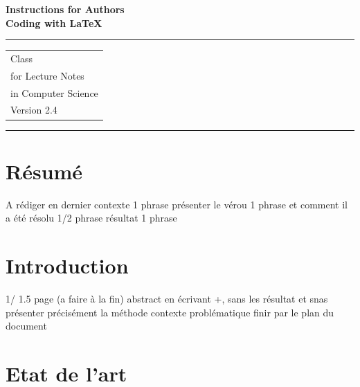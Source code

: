 \documentclass{llncs}
\begin{document}
\thispagestyle{empty}
\begin{flushleft}
\LARGE\bfseries Instructions for Authors\\
Coding with \LaTeX\\[2cm]
\end{flushleft}
\rule{\textwidth}{1pt}
\vspace{2pt}
\begin{flushright}
\Huge
\begin{tabular}{@{}l}
\LaTeXe{} Class\\
for Lecture Notes\\
in Computer Science\\[6pt]
{\Large Version 2.4}
\end{tabular}
\end{flushright}
\rule{\textwidth}{1pt}
\vfill
%
\newpage
\tableofcontents
\newpage
%
\section{Résumé}
%
 A rédiger en dernier
contexte 1 phrase
présenter le vérou 1 phrase
et comment il a été résolu 1/2 phrase
résultat 1 phrase
%
\section{Introduction}
%
1/ 1.5 page (a faire à la fin) abstract en écrivant +, sans les résultat et snas présenter précisément la méthode
contexte
problématique
finir par le plan du document


%
\section{Etat de l'art}
%
\end{document}
